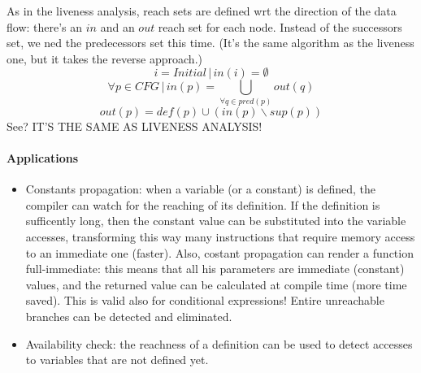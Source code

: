                         As in the liveness analysis, reach sets are defined wrt the direction of the data flow: there's an $in$ and an $out$ reach set for each node. 
						Instead of the successors set, we ned the predecessors set this time. (It's the same algorithm as the liveness one, but it takes the reverse 
						approach.)
                        \begin{equation}
                            i = Initial \,\vert\, in(i) = \emptyset
                        \end{equation}
                        \begin{equation}
                            \forall p \in CFG \,\vert\, in(p) = \bigcup\limits_{\forall q \in pred(p)} out(q)
                        \end{equation}
                        \begin{equation}
                            out(p) = def(p) \cup (in(p) \backslash sup(p))
                        \end{equation}
                        See? IT'S THE SAME AS LIVENESS ANALYSIS!
                    
                    \paragraph{Applications}
                        \begin{itemize}
                            \item Constants propagation: when a variable (or a constant) is defined, the compiler can watch for the reaching of its definition. If the 
							definition is sufficently long, then the constant value can be substituted into the variable accesses, transforming this way many 
							instructions that require memory access to an immediate one (faster). Also, costant propagation can render a function full-immediate: 
							this means that all his parameters are immediate (constant) values, and the returned value can be calculated at compile time (more time 
							saved). This is valid also for conditional expressions! Entire unreachable branches can be detected and eliminated.
                            \item Availability check: the reachness of a definition can be used to detect accesses to variables that are not defined yet. 
                        \end{itemize}